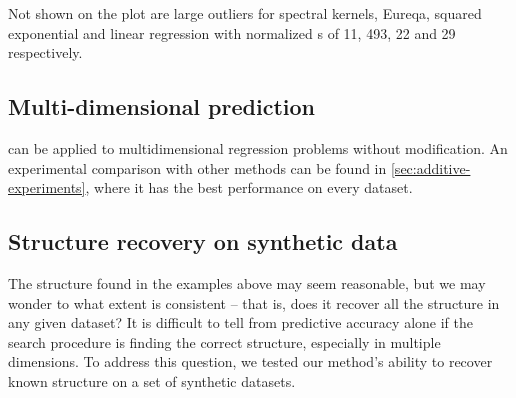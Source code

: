 Not shown on the plot are large outliers for spectral kernels, Eureqa, squared exponential and linear regression with normalized \RMSE{}s of 11, 493, 22 and 29 respectively.







\subsection{Multi-dimensional prediction}

\procedurename{} can be applied to multidimensional regression problems without modification.
An experimental comparison with other methods can be found in \cref{sec:additive-experiments}, where it has the best performance on every dataset.%



\subsection{Structure recovery on synthetic data}
\label{sec:synthetic}

The structure found in the examples above may seem reasonable, but we may wonder to what extent \procedurename{} is consistent -- that is, does it recover all the structure in any given dataset?
It is difficult to tell from predictive accuracy alone if the search procedure is finding the correct structure, especially in multiple dimensions.
To address this question, we tested our method's ability to recover known structure on a set of synthetic datasets.


